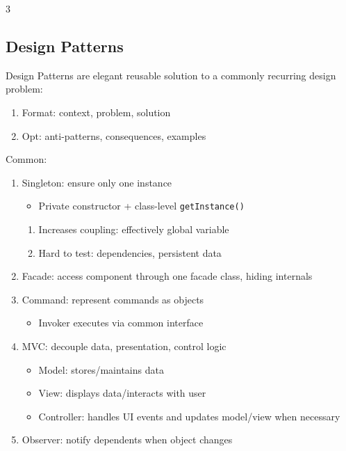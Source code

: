 \documentclass[12pt, a4paper]{article}
\begin{document}
\begin{multicols*}{3}
\subsection{Design Patterns}
Design Patterns are elegant reusable solution to a commonly recurring design problem:
\begin{enumerate}[\roman*.]
  \item Format: context, problem, solution
  \item Opt: anti-patterns, consequences, examples
\end{enumerate}
Common:
\begin{enumerate}[\roman*.]
  \item Singleton: ensure only one instance
    \begin{itemize}[leftmargin=*]\vspace{3pt}
      \item Private constructor + class-level \lstinline|getInstance()|
    \end{itemize}
    \begin{enumerate}[leftmargin=*,label=$-$]\vspace{5pt}
      \item Increases coupling: effectively global variable
      \item Hard to test: dependencies, persistent data
    \end{enumerate}
  \item Facade: access component through one facade class, hiding internals
  \item Command: represent commands as objects
    \begin{itemize}[leftmargin=*]\vspace{3pt}
      \item Invoker executes via common interface
    \end{itemize}
  \item MVC: decouple data, presentation, control logic
    \begin{itemize}[leftmargin=*]\vspace{3pt}
      \item Model: stores/maintains data
      \item View: displays data/interacts with user
      \item Controller: handles UI events and updates model/view when necessary
    \end{itemize}
  \item Observer: notify dependents when object changes
\end{enumerate}
\vspace{-1em}
\colbreak

\end{multicols*}
\end{document}
